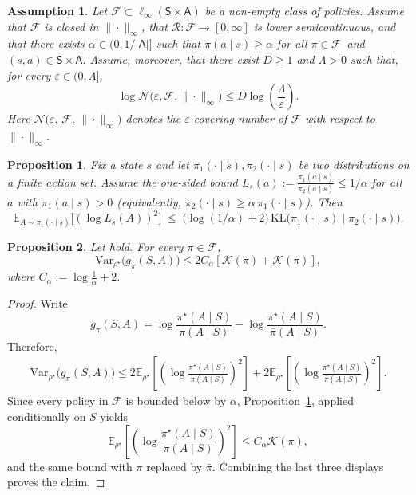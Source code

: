 \documentclass[10pt,a4paper]{amsart}
\newtheorem{assumption}{Assumption}
\newtheorem{proposition}{Proposition}
\newcommand{\E}{\mathbb{E}}
\newcommand{\Var}{\mathrm{Var}}
\begin{document}
\begin{assumption}
    \label{assum: F}
Let \(\mathcal F\subset \ell_\infty(\mathsf S\times\mathsf A)\) be a non-empty class of policies. Assume that \(\mathcal F\) is
closed in \(\|\cdot\|_\infty\), that
\(\mathcal R:\mathcal F\to[0,\infty]\) is lower semicontinuous, and that
there exists \(\alpha\in(0,1/|\mathsf A|]\) such that
\(
    \pi(a\mid s)\geq\alpha 
\) for all \(\pi\in\mathcal F\)\ and 
    \((s,a)\in\mathsf S\times\mathsf A.\)
Assume, moreover, that there exist \(D\geq1\) and \(\Lambda>0\) such that,
for every \(\varepsilon\in(0,\Lambda]\),
\begin{equation}
\label{eq:entropy-bound}
    \log\mathcal N
    \bigl(\varepsilon,\mathcal F,\|\cdot\|_\infty\bigr)
    \leq
    D\log\left(\frac{\Lambda}{\varepsilon}\right).
\end{equation}
Here \(\mathcal N\big(\varepsilon,\,\mathcal F,\,\|\cdot\|_\infty\big)\) denotes the $\varepsilon$-covering number of $\mathcal F$ with respect to
$\|\cdot\|_\infty$.
\end{assumption}

\begin{proposition}
\label{lem:kl-2}
Fix a state \(s\) and let \(\pi_1(\cdot\mid s),\pi_2(\cdot\mid s)\) be two distributions on a finite action set.
Assume the one-sided bound \(L_s(a):=\tfrac{\pi_1(a\mid s)}{\pi_2(a\mid s)}\le 1/\alpha\) for all \(a\) with \(\pi_1(a\mid s)>0\) (equivalently, \(\pi_2(\cdot\mid s)\ge \alpha\,\pi_1(\cdot\mid s)\)).
Then
\[
\mathbb E_{A \sim \pi_1(\cdot\mid s)}\!\big[(\log L_s(A))^2\big]
\;\le\; \big(\log(1/\alpha)+2\big)\,
\mathrm{KL}\!\big(\pi_1(\cdot\mid s)\mid \pi_2(\cdot\mid s)\big).
\]
\end{proposition}

\begin{proposition}
\label{prop:likelihood-ratio-variance}
Let  hold. For every \(\pi\in\mathcal F\), 
\[
    \Var_{\rho^\star}\bigl(g_\pi(S,A)\bigr)
    \leq
    2C_\alpha
    \left[
        \mathcal K(\pi)+\mathcal K(\bar\pi)
    \right], 
\]
where \(C_\alpha:=\log\frac1\alpha+2.\)
\end{proposition}

\begin{proof}
Write
\[
    g_\pi(S,A)
    =
    \log\frac{\pi^\star(A\mid S)}{\pi(A\mid S)}
    -
    \log\frac{\pi^\star(A\mid S)}{\bar\pi(A\mid S)}.
\]
Therefore,
\begin{align*}
    \Var_{\rho^\star}\bigl(g_\pi(S,A)\bigr)
\leq
    2\E_{\rho^\star}
    \left[
        \left(
            \log\frac{\pi^\star(A\mid S)}{\pi(A\mid S)}
        \right)^2
    \right]
    +
    2\E_{\rho^\star}
    \left[
        \left(
            \log\frac{\pi^\star(A\mid S)}{\bar\pi(A\mid S)}
        \right)^2
    \right].
\end{align*}
Since every policy in \(\mathcal F\) is bounded below by \(\alpha\),
Proposition~\ref{lem:kl-2}, applied conditionally on \(S\) yields
\[
    \E_{\rho^\star}
    \left[
        \left(
            \log\frac{\pi^\star(A\mid S)}{\pi(A\mid S)}
        \right)^2
    \right]
    \leq
    C_\alpha\mathcal K(\pi),
\]
and the same bound with \(\pi\) replaced by \(\bar\pi\). Combining the
last three displays proves the claim.
\end{proof}
\end{document}
